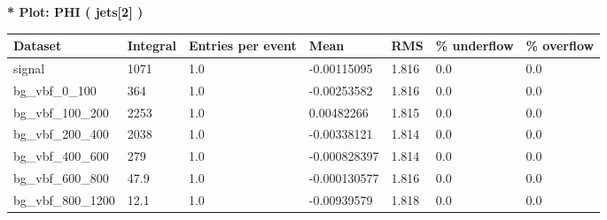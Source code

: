 \documentclass[a4paper, 10pt]{article}
\begin{document}
\textbf{* Plot: PHI ( jets[2] ) }\\
   \begin{table}[H]
  \begin{center}
    \begin{tabular}{|m{23.0mm}|m{23.0mm}|m{18.0mm}|m{19.0mm}|m{19.0mm}|m{19.0mm}|m{19.0mm}|}
      \hline
      {\cellcolor{yellow}         Dataset}& {\cellcolor{yellow}         Integral}& {\cellcolor{yellow}         Entries per event}& {\cellcolor{yellow}         Mean}& {\cellcolor{yellow}         RMS}& {\cellcolor{yellow}         \% underflow}& {\cellcolor{yellow}         \% overflow}\\
      \hline
      {\cellcolor{white}         signal}& {\cellcolor{white}         1071}& {\cellcolor{white}         1.0}& {\cellcolor{white}         -0.00115095}& {\cellcolor{white}         1.816}& {\cellcolor{green}         0.0}& {\cellcolor{green}         0.0}\\
      \hline
      {\cellcolor{white}         bg\_vbf\_0\_100}& {\cellcolor{white}         364}& {\cellcolor{white}         1.0}& {\cellcolor{white}         -0.00253582}& {\cellcolor{white}         1.816}& {\cellcolor{green}         0.0}& {\cellcolor{green}         0.0}\\
      \hline
      {\cellcolor{white}         bg\_vbf\_100\_200}& {\cellcolor{white}         2253}& {\cellcolor{white}         1.0}& {\cellcolor{white}         0.00482266}& {\cellcolor{white}         1.815}& {\cellcolor{green}         0.0}& {\cellcolor{green}         0.0}\\
      \hline
      {\cellcolor{white}         bg\_vbf\_200\_400}& {\cellcolor{white}         2038}& {\cellcolor{white}         1.0}& {\cellcolor{white}         -0.00338121}& {\cellcolor{white}         1.814}& {\cellcolor{green}         0.0}& {\cellcolor{green}         0.0}\\
      \hline
      {\cellcolor{white}         bg\_vbf\_400\_600}& {\cellcolor{white}         279}& {\cellcolor{white}         1.0}& {\cellcolor{white}         -0.000828397}& {\cellcolor{white}         1.814}& {\cellcolor{green}         0.0}& {\cellcolor{green}         0.0}\\
      \hline
      {\cellcolor{white}         bg\_vbf\_600\_800}& {\cellcolor{white}         47.9}& {\cellcolor{white}         1.0}& {\cellcolor{white}         -0.000130577}& {\cellcolor{white}         1.816}& {\cellcolor{green}         0.0}& {\cellcolor{green}         0.0}\\
      \hline
      {\cellcolor{white}         bg\_vbf\_800\_1200}& {\cellcolor{white}         12.1}& {\cellcolor{white}         1.0}& {\cellcolor{white}         -0.00939579}& {\cellcolor{white}         1.818}& {\cellcolor{green}         0.0}& {\cellcolor{green}         0.0}\\

\end{tabular}
\end{center}
\end{table}
\end{document}
